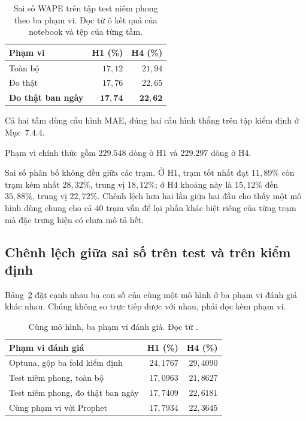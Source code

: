 \begin{table}[htbp]
\centering

\small
\begin{tabular}{l r r}
\toprule
\textbf{Phạm vi} & \textbf{H1 (\%)} & \textbf{H4 (\%)} \\
\midrule
Toàn bộ                   & $17{,}12$ & $21{,}94$ \\
Đo thật                   & $17{,}76$ & $22{,}65$ \\
\textbf{Đo thật ban ngày} & $\mathbf{17{,}74}$ & $\mathbf{22{,}62}$ \\
\bottomrule
\end{tabular}
\caption[Sai số WAPE trên tập test niêm phong theo ba phạm vi]{Sai số WAPE trên tập test niêm phong theo ba phạm vi. Đọc từ ô kết quả của notebook
 và tệp  của từng tầm.}
\label{tab:ket_qua_test}
\end{table}

Cả hai tầm dùng cấu hình MAE, đúng hai cấu hình thắng trên tập kiểm định ở Mục~$7.4.4$.

Phạm vi chính thức gồm $229.548$ dòng ở H1 và $229.297$ dòng ở H4.

Sai số phân bố không đều giữa các trạm. Ở H1, trạm tốt nhất đạt $11{,}89\%$ còn trạm kém nhất
$28{,}32\%$, trung vị $18{,}12\%$; ở H4 khoảng này là $15{,}12\%$ đến $35{,}88\%$, trung vị
$22{,}72\%$. Chênh lệch hơn hai lần giữa hai đầu cho thấy một mô hình dùng chung cho cả $40$
trạm vẫn để lại phần khác biệt riêng của từng trạm mà đặc trưng hiện có chưa mô tả hết.

\FloatBarrier
\subsection{Chênh lệch giữa sai số trên test và trên kiểm định}

Bảng~\ref{tab:ba_pham_vi} đặt cạnh nhau ba con số của cùng một mô hình ở ba phạm vi đánh giá
khác nhau. Chúng không so trực tiếp được với nhau, phải đọc kèm phạm vi.

\begin{table}[htbp]
\centering

\small
\begin{tabular}{l r r}
\toprule
\textbf{Phạm vi đánh giá} & \textbf{H1 (\%)} & \textbf{H4 (\%)} \\
\midrule
Optuna, gộp ba fold kiểm định   & $24{,}1767$ & $29{,}4090$ \\
Test niêm phong, toàn bộ        & $17{,}0963$ & $21{,}8627$ \\
Test niêm phong, đo thật ban ngày & $17{,}7409$ & $22{,}6181$ \\
Cùng phạm vi với Prophet        & $17{,}7934$ & $22{,}3645$ \\
\bottomrule
\end{tabular}
\caption[Cùng mô hình, ba phạm vi đánh giá]{Cùng mô hình, ba phạm vi đánh giá. Đọc từ
.}
\label{tab:ba_pham_vi}
\end{table}

